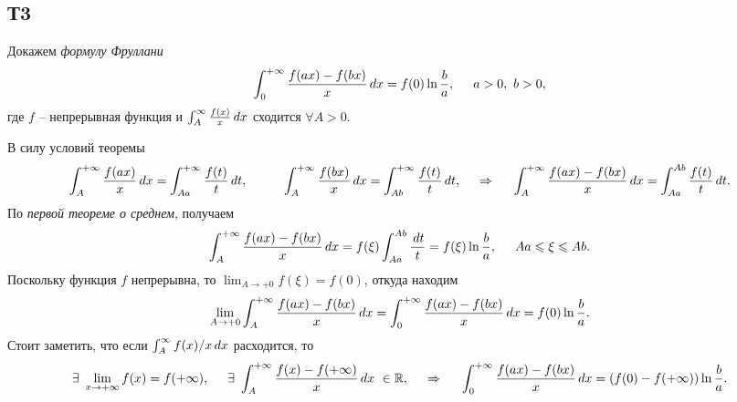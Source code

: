 \subsection{Т3}

Докажем \textit{формулу Фруллани}
\begin{equation*}
    \int_0^{+\infty} \frac{f(ax)-f(bx)}{x} \, d x = f(0) \ln \frac{b}{a}, \hspace{5 mm}
    a > 0, \ b > 0,
\end{equation*}
где $f$ -- непрерывная функция и $\int_A^{\infty} \frac{f(x)}{x} \, d x$ сходится $\forall A > 0$. 

В силу условий теоремы
\begin{equation*}
    \int_{A}^{+\infty} \frac{f(ax)}{x} \d x = \int_{Aa}^{+\infty} \frac{f(t)}{t} \d t,
    \hspace{10 mm}
    \int_{A}^{+\infty} \frac{f(bx)}{x} \d x = \int_{Ab}^{+\infty} \frac{f(t)}{t} \d t,
    \hspace{0.5cm} \Rightarrow \hspace{0.5cm}
    \int_{A}^{+\infty}  \frac{f(ax)-f(bx)}{x} \d x = \int_{Aa}^{Ab} \frac{f(t)}{t} \d t.
\end{equation*}
По \textit{первой теореме о среднем}, получаем
\begin{equation*}
    \int_{A}^{+\infty} \frac{f(ax)-f(bx)}{x} \, d x = f(\xi) \int_{Aa}^{Ab} \frac{\, d t}{t} = f(\xi) \ln \frac{b}{a},
    \hspace{5 mm} 
    Aa \leqslant \xi \leqslant Ab.
\end{equation*}
Поскольку функция $f$ непрерывна, то $\lim_{A \to +0} f(\xi) = f(0)$, откуда находим
\begin{equation}
     \lim_{A \to +0} \int_{A}^{+\infty}  \frac{f(ax)-f(bx)}{x} \, d x = \int_0^{+\infty} \frac{f(ax)-f(bx)}{x} \, d x = f(0) \ln \frac{b}{a}.
 \end{equation} 
Стоит заметить, что если $\int_A^\infty f(x)/x \, d x$ расходится, то
\begin{equation*}
    \exists \ \lim_{x \to + \infty} f(x) = f(+\infty),
    \hspace{5 mm}
    \exists \ \int_{A}^{+\infty} \frac{f(x)-f(+\infty)}{x} \, d x \ \in \mathbb{R},
    \hspace{0.5cm} \Rightarrow \hspace{0.5cm}
    \int_0^{+\infty}  \frac{f(ax)-f(bx)}{x} \, d x = 
    \left(
        f(0) - f(+\infty)
    \right) \ln \frac{b}{a}.
\end{equation*}